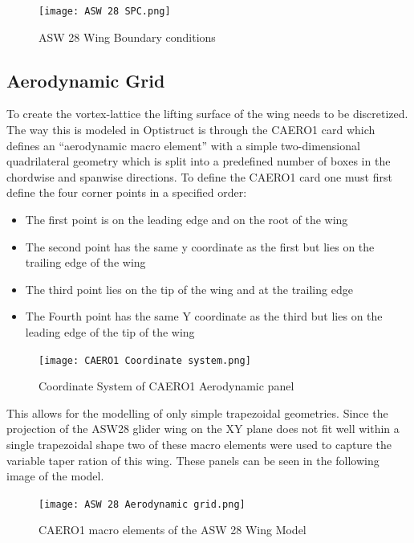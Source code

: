 \begin{figure}[H]
\centering
\texttt{[image: ASW 28 SPC.png]}
\caption{ASW 28 Wing Boundary conditions}
\end{figure}

\subsection{Aerodynamic Grid}
\label{aerodynamic-grid}

To create the vortex-lattice the lifting surface of the wing needs to be
discretized. The way this is modeled in Optistruct is through the CAERO1
card which defines an ``aerodynamic macro element'' with a simple
two-dimensional quadrilateral geometry which is split into a predefined
number of boxes in the chordwise and spanwise directions. To define the
CAERO1 card one must first define the four corner points in a specified
order:

\begin{itemize}
\item
  The first point is on the leading edge and on the root of the wing
\item
  The second point has the same y coordinate as the first but lies on
  the trailing edge of the wing
\item
  The third point lies on the tip of the wing and at the trailing edge
\item
  The Fourth point has the same Y coordinate as the third but lies on
  the leading edge of the tip of the wing
\end{itemize}

\begin{figure}[H]
    \centering
    \texttt{[image: CAERO1 Coordinate system.png]}
    \caption{Coordinate System of CAERO1 Aerodynamic panel \cite{altair_flutter_tips}}
\end{figure}


This allows for the modelling of only simple trapezoidal geometries.
Since the projection of the ASW28 glider wing on the XY plane does not
fit well within a single trapezoidal shape two of these macro elements
were used to capture the variable taper ration of this wing. These
panels can be seen in the following image of the model.

\begin{figure}[H]
\centering
\texttt{[image: ASW 28 Aerodynamic grid.png]}
\caption{CAERO1 macro elements of the ASW 28 Wing Model}
\end{figure}

